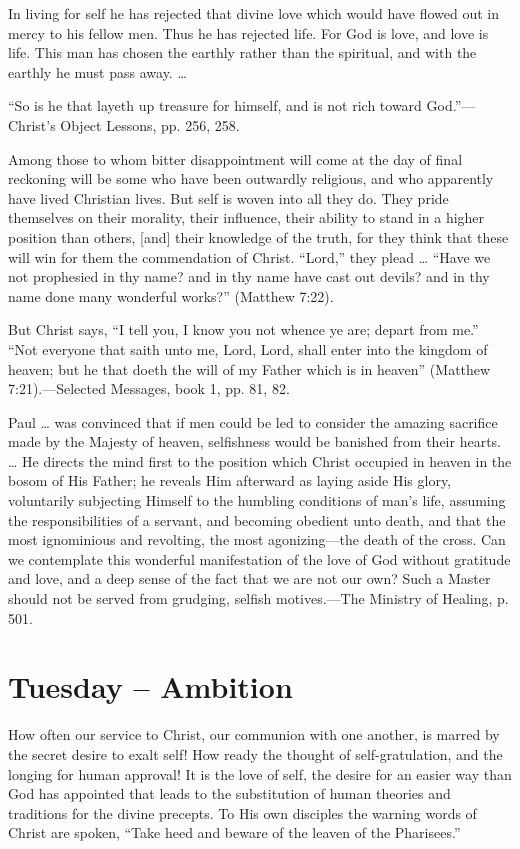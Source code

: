 \documentclass[a4paper, 10pt, twoside, headings=small]{scrartcl}
\begin{document}
\begin{multicols}{2}
In living for self he has rejected that divine love which would have flowed out in mercy to his fellow men. Thus he has rejected life. For God is love, and love is life. This man has chosen the earthly rather than the spiritual, and with the earthly he must pass away. …

“So is he that layeth up treasure for himself, and is not rich toward God.”—Christ’s Object Lessons, pp. 256, 258.

Among those to whom bitter disappointment will come at the day of final reckoning will be some who have been outwardly religious, and who apparently have lived Christian lives. But self is woven into all they do. They pride themselves on their morality, their influence, their ability to stand in a higher position than others, [and] their knowledge of the truth, for they think that these will win for them the commendation of Christ. “Lord,” they plead … “Have we not prophesied in thy name? and in thy name have cast out devils? and in thy name done many wonderful works?” (Matthew 7:22).

But Christ says, “I tell you, I know you not whence ye are; depart from me.” “Not everyone that saith unto me, Lord, Lord, shall enter into the kingdom of heaven; but he that doeth the will of my Father which is in heaven” (Matthew 7:21).—Selected Messages, book 1, pp. 81, 82.

Paul … was convinced that if men could be led to consider the amazing sacrifice made by the Majesty of heaven, selfishness would be banished from their hearts. … He directs the mind first to the position which Christ occupied in heaven in the bosom of His Father; he reveals Him afterward as laying aside His glory, voluntarily subjecting Himself to the humbling conditions of man’s life, assuming the responsibilities of a servant, and becoming obedient unto death, and that the most ignominious and revolting, the most agonizing—the death of the cross. Can we contemplate this wonderful manifestation of the love of God without gratitude and love, and a deep sense of the fact that we are not our own? Such a Master should not be served from grudging, selfish motives.—The Ministry of Healing, p. 501.

\section*{Tuesday – Ambition}

How often our service to Christ, our communion with one another, is marred by the secret desire to exalt self! How ready the thought of self-gratulation, and the longing for human approval! It is the love of self, the desire for an easier way than God has appointed that leads to the substitution of human theories and traditions for the divine precepts. To His own disciples the warning words of Christ are spoken, “Take heed and beware of the leaven of the Pharisees.”


\end{multicols}
\end{document}
